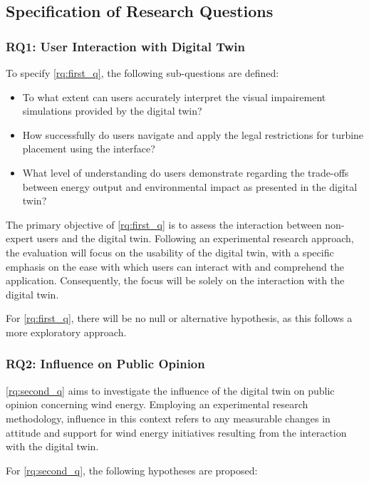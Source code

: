 \documentclass[11pt, titlepage, a4paper]{scrartcl}
\begin{document}
\begin{linenumbers}
    \subsection{Specification of Research Questions}

    \subsubsection{RQ1: User Interaction with Digital Twin}

    To specify \ref{rq:first_q}, the following sub-questions are defined:

    \begin{itemize}[label={--}]
        \item To what extent can users accurately interpret the visual impairement simulations provided by the digital twin?
        \item How successfully do users navigate and apply the legal restrictions for turbine placement using the interface?
        \item What level of understanding do users demonstrate regarding the trade-offs between energy output and environmental impact as presented in the digital twin?
    \end{itemize}

    The primary objective of \ref{rq:first_q} is to assess the interaction between non-expert users and the digital twin. Following an experimental research approach, the evaluation will focus on the usability of the digital twin, with a specific emphasis on the ease with which users can interact with and comprehend the application. Consequently, the focus will be solely on the interaction with the digital twin.

    For \ref{rq:first_q}, there will be no null or alternative hypothesis, as this follows a more exploratory approach.

    \subsubsection{RQ2: Influence on Public Opinion}

    \ref{rq:second_q} aims to investigate the influence of the digital twin on public opinion concerning wind energy. Employing an experimental research methodology, influence in this context refers to any measurable changes in attitude and support for wind energy initiatives resulting from the interaction with the digital twin.

    For \ref{rq:second_q}, the following hypotheses are proposed:


\end{linenumbers}
\end{document}
